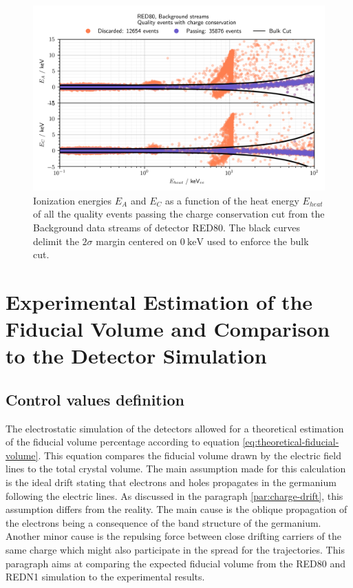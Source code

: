 \begin{figure}
\centering
\includegraphics[scale=1]{Figures/ElectrodesExperimental/bulk_cut.png}
\caption{Ionization energies $E_A$ and $E_C$ as a function of the heat energy $E_{heat}$ of all the quality events passing the charge conservation cut from the Background data streams of detector RED80. The black curves delimit the $2\sigma$ margin centered on $\SI{0}{\kilo\eV}$ used to enforce the bulk cut.}
\label{fig:fiducial-cut}
\end{figure}


\subsection{}





\section{Experimental Estimation of the Fiducial Volume and Comparison to the Detector Simulation}

\subsection{Control values definition}

The electrostatic simulation of the detectors allowed for a theoretical estimation of the fiducial volume percentage according to equation \ref{eq:theoretical-fiducial-volume}. This equation compares the fiducial volume drawn by the electric field lines to the total crystal volume. The main assumption made for this calculation is the ideal drift stating that electrons and holes propagates in the germanium following the electric lines. As discussed in the paragraph \ref{par:charge-drift}, this assumption differs from the reality. The main cause is the oblique propagation of the electrons being a consequence of the band structure of the germanium. Another minor cause is the repulsing force between close drifting carriers of the same charge which might also participate in the spread for the trajectories. This paragraph aims at comparing the expected fiducial volume from the RED80 and REDN1 simulation to the experimental results.

